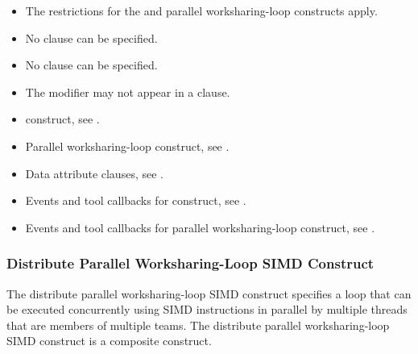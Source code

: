 \restrictions
\begin{itemize}
\item The restrictions for the  and parallel worksharing-loop constructs apply.
\item No  clause can be specified.
\item No  clause can be specified.
\item The  modifier may not appear in a  clause.
\end{itemize}



\crossreferences
\begin{itemize}
\item {} construct, see
.

\item Parallel worksharing-loop construct, see
.

\item Data attribute clauses, see
.

\item Events and tool callbacks for  construct, see
.

\item Events and tool callbacks for parallel worksharing-loop construct, see
.

\end{itemize}






\subsubsection{Distribute Parallel Worksharing-Loop SIMD Construct}
\label{subsec:Distribute Parallel Worksharing-Loop SIMD Construct}
\summary
The distribute parallel worksharing-loop SIMD construct specifies a loop that can be executed
concurrently using SIMD instructions in parallel by multiple threads that are members
of multiple teams. The distribute parallel worksharing-loop SIMD construct is a composite construct.

